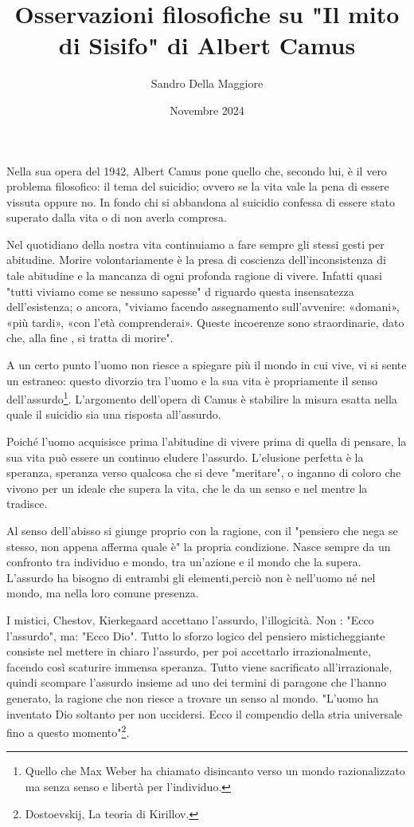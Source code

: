 \documentclass[a4paper,12pt,oneside]{article}%
\begin{document}
	\author{Sandro Della Maggiore}
	\title{Osservazioni filosofiche su "Il mito di Sisifo" di Albert Camus}
	\date{Novembre 2024}
	
	\maketitle
	
Nella sua opera del 1942, Albert Camus pone quello che, secondo lui, è il vero problema filosofico: il tema del suicidio; ovvero se la vita vale la pena di essere vissuta	oppure no. In fondo chi si abbandona al suicidio confessa di essere stato superato dalla vita o di non averla compresa.

Nel quotidiano della nostra vita continuiamo a fare sempre gli stessi gesti per abitudine. Morire volontariamente è la presa di coscienza dell'inconsistenza di tale abitudine e la mancanza di ogni profonda ragione di vivere. Infatti quasi "tutti viviamo come se nessuno sapesse" d riguardo questa insensatezza dell'esistenza; o ancora, "viviamo facendo assegnamento sull'avvenire: «domani», «più tardi», «con l'età comprenderai». Queste incoerenze sono straordinarie, dato che, alla fine , si tratta di morire".

A un certo punto l'uomo non riesce a spiegare più il mondo in cui vive, vi si sente un estraneo: questo divorzio tra l'uomo e la sua vita è propriamente il senso dell'assurdo\footnote{Quello che Max Weber ha chiamato disincanto verso un mondo razionalizzato ma senza  senso e libertà per l'individuo.}. L'argomento dell'opera di Camus è stabilire la misura esatta nella quale il suicidio sia una risposta all'assurdo.

Poiché l'uomo acquisisce prima l'abitudine di vivere prima di quella di pensare, la sua vita può essere un continuo eludere l'assurdo. L'elusione perfetta è la speranza, speranza verso qualcosa che si deve "meritare", o inganno di coloro che vivono per un ideale che supera la vita, che le da un senso e nel mentre la tradisce.

Al senso dell'abisso si giunge proprio con la ragione, con il "pensiero che nega se stesso, non appena afferma quale è" la propria condizione. Nasce sempre da un confronto tra individuo e mondo, tra un'azione e il mondo che la supera. L'assurdo ha bisogno di entrambi gli elementi,perciò non è nell'uomo né nel mondo, ma nella loro comune presenza.

I mistici, Chestov, Kierkegaard accettano l'assurdo, l'illogicità. Non : "Ecco l'assurdo", ma: "Ecco Dio". Tutto lo sforzo logico del pensiero misticheggiante consiste nel mettere in chiaro l'assurdo, per poi accettarlo irrazionalmente, facendo così scaturire immensa speranza. Tutto viene sacrificato all'irrazionale, quindi scompare l'assurdo insieme ad uno dei termini di paragone che l'hanno generato, la ragione che non riesce a trovare un senso al mondo. "L'uomo ha inventato Dio soltanto per non uccidersi. Ecco il compendio della stria universale fino a questo momento"\footnote{Dostoevskij, La teoria di Kirillov.}.
\end{document}
